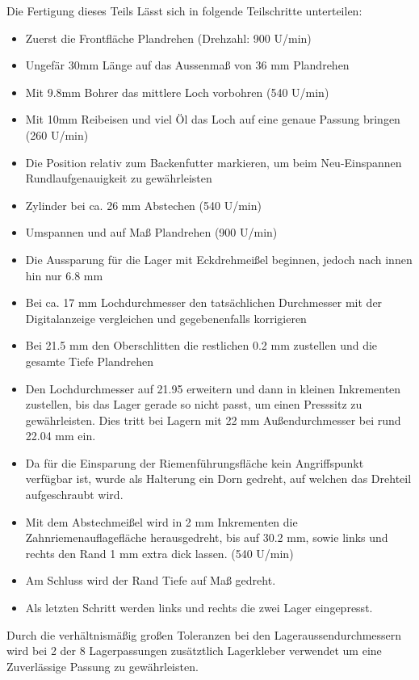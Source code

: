Die Fertigung dieses Teils Lässt sich in folgende Teilschritte unterteilen:
\begin{itemize}
    \setlength\itemsep{-1mm} %
    \item Zuerst die Frontfläche Plandrehen (Drehzahl: 900 U/min)
    \item Ungefär 30mm Länge auf das Aussenmaß von 36 mm Plandrehen
    \item Mit 9.8mm Bohrer das mittlere Loch vorbohren (540 U/min)
    \item Mit 10mm Reibeisen und viel Öl das Loch auf eine genaue Passung bringen (260 U/min)
    \item Die Position relativ zum Backenfutter markieren, um beim Neu-Einspannen Rundlaufgenauigkeit zu gewährleisten
    \item Zylinder bei ca. 26 mm Abstechen (540 U/min)
    \item Umspannen und auf Maß Plandrehen (900 U/min)
    \item Die Aussparung für die Lager mit Eckdrehmeißel beginnen, jedoch nach innen hin nur 6.8 mm
    \item Bei ca. 17 mm Lochdurchmesser den tatsächlichen Durchmesser mit der Digitalanzeige vergleichen und gegebenenfalls korrigieren
    \item Bei 21.5 mm den Oberschlitten die restlichen 0.2 mm zustellen und die gesamte Tiefe Plandrehen
    \item Den Lochdurchmesser auf 21.95 erweitern und dann in kleinen Inkrementen zustellen, bis das Lager gerade so nicht passt, um einen Presssitz zu gewährleisten. Dies tritt bei Lagern mit 22 mm Außendurchmesser bei rund 22.04 mm ein.
    \item Da für die Einsparung der Riemenführungsfläche kein Angriffspunkt verfügbar ist, wurde als Halterung ein Dorn gedreht, auf welchen das Drehteil aufgeschraubt wird.
    \item Mit dem Abstechmeißel wird in 2 mm Inkrementen die Zahnriemenauflagefläche herausgedreht, bis auf 30.2 mm, sowie links und rechts den Rand 1 mm extra dick lassen. (540 U/min)
    \item Am Schluss wird der Rand Tiefe auf Maß gedreht.
    \item Als letzten Schritt werden links und rechts die zwei Lager eingepresst.
\end{itemize}

    Durch die verhältnismäßig großen Toleranzen bei den Lageraussendurchmessern wird bei 2 der 8 Lagerpassungen zusätztlich Lagerkleber verwendet um eine Zuverlässige Passung zu gewährleisten.

